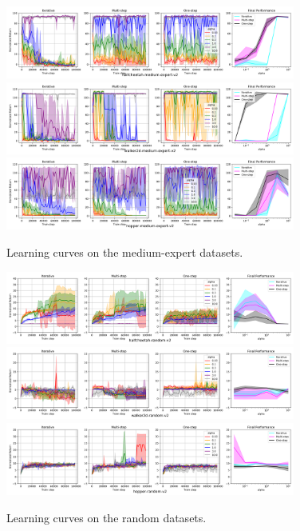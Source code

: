 \begin{subappendices}
\begin{figure}[h]
    \centering
    \includegraphics[width=0.85\textwidth]{figures/offline-rl/learning curves/lc-halfcheetah-medium-expert-v2.png}
    \includegraphics[width=0.85\textwidth]{figures/offline-rl/learning curves/lc-walker2d-medium-expert-v2.png}
    \includegraphics[width=0.85\textwidth]{figures/offline-rl/learning curves/lc-hopper-medium-expert-v2.png}
    \vspace{-0.2cm}
    \caption{Learning curves on the medium-expert datasets.}
    \label{fig:app_lc_medium-expert}
\end{figure}


\begin{figure}[h]
    \centering
    \includegraphics[width=0.85\textwidth]{figures/offline-rl/learning curves/lc-halfcheetah-random-v2.png}
    \includegraphics[width=0.85\textwidth]{figures/offline-rl/learning curves/lc-walker2d-random-v2.png}
    \includegraphics[width=0.85\textwidth]{figures/offline-rl/learning curves/lc-hopper-random-v2.png}
    \vspace{-0.2cm}
    \caption{Learning curves on the random datasets.}
    \label{fig:app_lc_random}
\end{figure}
\end{subappendices}



\printendnotes